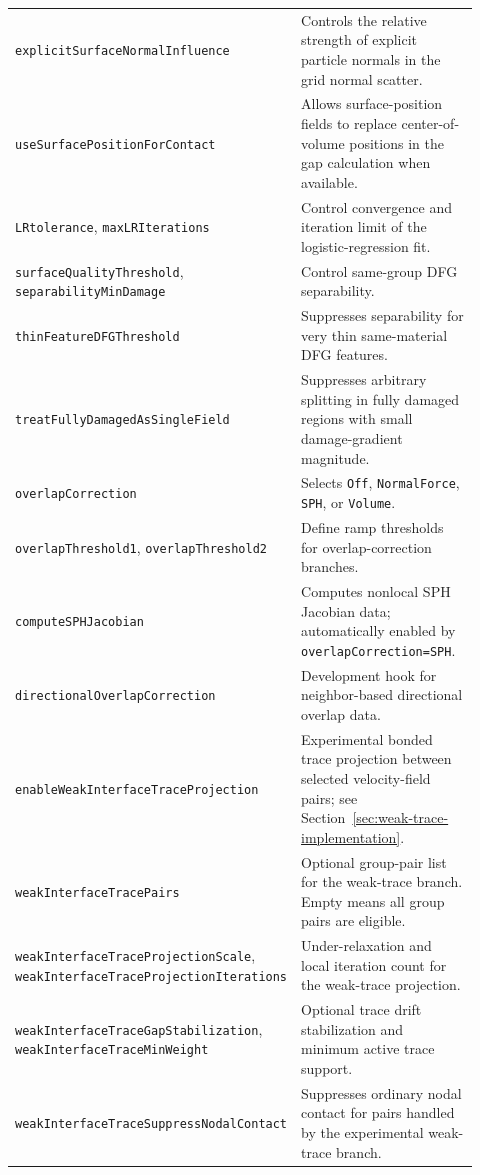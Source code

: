 \begin{longtable}{>{\raggedright\arraybackslash}p{0.36\linewidth}>{\raggedright\arraybackslash}p{0.56\linewidth}}
\texttt{explicitSurfaceNormalInfluence} & Controls the relative strength of explicit particle normals in the grid normal scatter. \\
\texttt{useSurfacePositionForContact} & Allows surface-position fields to replace center-of-volume positions in the gap calculation when available. \\
\texttt{LRtolerance}, \texttt{maxLRIterations} & Control convergence and iteration limit of the logistic-regression fit. \\
\texttt{surfaceQualityThreshold}, \texttt{separabilityMinDamage} & Control same-group DFG separability. \\
\texttt{thinFeatureDFGThreshold} & Suppresses separability for very thin same-material DFG features. \\
\texttt{treatFullyDamagedAsSingleField} & Suppresses arbitrary splitting in fully damaged regions with small damage-gradient magnitude. \\
\texttt{overlapCorrection} & Selects \texttt{Off}, \texttt{NormalForce}, \texttt{SPH}, or \texttt{Volume}. \\
\texttt{overlapThreshold1}, \texttt{overlapThreshold2} & Define ramp thresholds for overlap-correction branches. \\
\texttt{computeSPHJacobian} & Computes nonlocal SPH Jacobian data; automatically enabled by \texttt{overlapCorrection=SPH}. \\
\texttt{directionalOverlapCorrection} & Development hook for neighbor-based directional overlap data. \\
\texttt{enableWeakInterfaceTraceProjection} & Experimental bonded trace projection between selected velocity-field pairs; see Section~\ref{sec:weak-trace-implementation}. \\
\texttt{weakInterfaceTracePairs} & Optional group-pair list for the weak-trace branch.  Empty means all group pairs are eligible. \\
\texttt{weakInterfaceTraceProjectionScale}, \texttt{weakInterfaceTraceProjectionIterations} & Under-relaxation and local iteration count for the weak-trace projection. \\
\texttt{weakInterfaceTraceGapStabilization}, \texttt{weakInterfaceTraceMinWeight} & Optional trace drift stabilization and minimum active trace support. \\
\texttt{weakInterfaceTraceSuppressNodalContact} & Suppresses ordinary nodal contact for pairs handled by the experimental weak-trace branch. \\
\bottomrule
\end{longtable}
\endgroup



